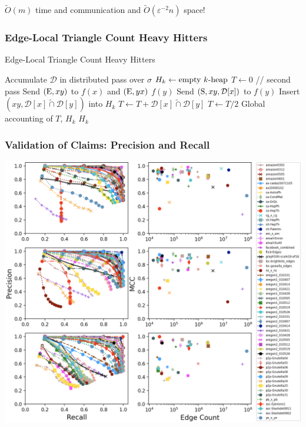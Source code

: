 \documentclass{beamer}
\begin{document}
\begin{frame}
\begin{block}{}
\begin{center}
$\widetilde{O}(m)$ time and communication and $\widetilde{O}(\varepsilon^{-2}n)$ space!
\end{center}
\end{block}

\end{frame}


\begin{frame}
\frametitle{Edge-Local Triangle Count Heavy Hitters}

\begin{algorithm}[H]
\caption{Edge-Local Triangle Count Heavy Hitters}\label{alg:sublinear_kpath}
\begin{algorithmic}[1]
\State Accumulate $\mathcal{D}$ in distributed pass over $\sigma$
\State $H_k \gets \textnormal{empty $k$-heap}$
\State $T \gets 0$
  \qquad // second pass
	\State Send $(\textnormal{E}, xy)$ to $f(x)$ and $(\textnormal{E}, yx)$ $f(y)$
		\State Send $(\textnormal{S}, xy, \mathcal{D}[x])$ to $f(y)$
	\EndFor
		\State Insert $(xy, \mathcal{D}[x] \widetilde{\cap} \mathcal{D}[y])$ into $H_k$
		\State $T \gets T + \mathcal{D}[x] \widetilde{\cap} \mathcal{D}[y]$
	\EndFor
\EndParFor
\State $T \gets T / 2$
\State Global accounting of $T$, $H_k$
\State \Return $H_k$
\end{algorithmic}
\end{algorithm}



\end{frame}



\begin{frame}
\frametitle{Validation of Claims: Precision and Recall}

\centerline{\includegraphics[width=0.7\columnwidth]{precision_vs_recall_all}}

\end{frame}
\end{document}
